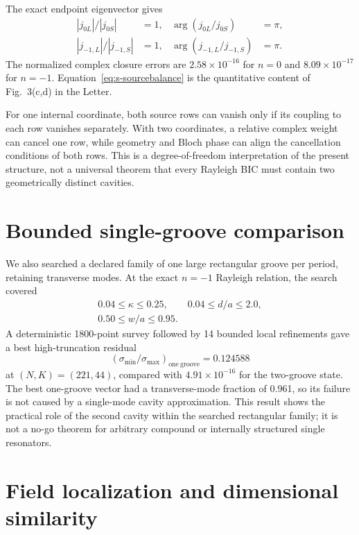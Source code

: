 \documentclass[aps,prl,reprint,superscriptaddress,nofootinbib,floatfix]{revtex4-2}
\begin{document}
The exact endpoint eigenvector gives
\begin{align}
 |j_{0L}|/|j_{0S}|&=1,&
 \arg(j_{0L}/j_{0S})&=\pi,\\
 |j_{-1,L}|/|j_{-1,S}|&=1,&
 \arg(j_{-1,L}/j_{-1,S})&=\pi.
 \label{eq:s-sourcebalance}
\end{align}
The normalized complex closure errors are $2.58\times10^{-16}$ for $n=0$
and $8.09\times10^{-17}$ for $n=-1$.  Equation~\eqref{eq:s-sourcebalance}
is the quantitative content of Fig.~3(c,d) in the Letter.

For one internal coordinate, both source rows can vanish only if its coupling
to each row vanishes separately.  With two coordinates, a relative complex
weight can cancel one row, while geometry and Bloch phase can align the
cancellation conditions of both rows.  This is a degree-of-freedom
interpretation of the present structure, not a universal theorem that every
Rayleigh BIC must contain two geometrically distinct cavities.

\section{Bounded single-groove comparison}

We also searched a declared family of one large rectangular groove per period,
retaining transverse modes.  At the exact $n=-1$ Rayleigh relation, the search
covered
\begin{equation}
 \begin{gathered}
 0.04\leq\kappa\leq0.25,\qquad
 0.04\leq d/a\leq2.0,\\
 0.50\leq w/a\leq0.95.
 \end{gathered}
\end{equation}
A deterministic 1800-point survey followed by 14 bounded local refinements
gave a best high-truncation residual
\begin{equation}
 (\sigma_{\min}/\sigma_{\max})_{\mathrm{one\ groove}}=0.124588
\end{equation}
at $(N,K)=(221,44)$, compared with
$4.91\times10^{-16}$ for the two-groove state.  The best one-groove vector
had a transverse-mode fraction of 0.961, so its failure is not caused by a
single-mode cavity approximation.  This result shows the practical role of
the second cavity within the searched rectangular family; it is not a no-go
theorem for arbitrary compound or internally structured single resonators.

\section{Field localization and dimensional similarity}
\end{document}
